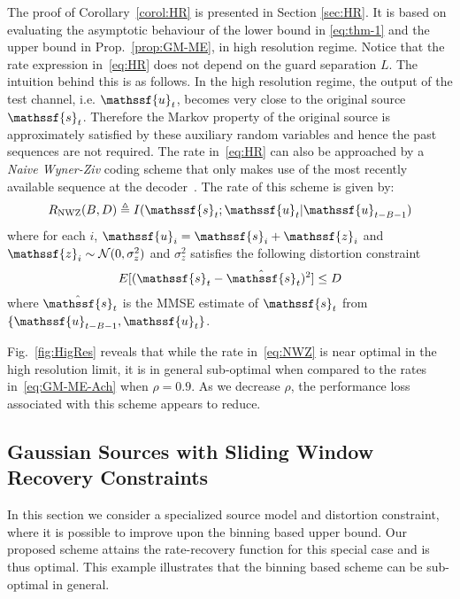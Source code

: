 \documentclass[journal, twocolumn, 10pt]{IEEEtran}
\newcommand{\cN}{{\mathcal{N}}}
\newcommand{\rvs}{{\mathssf{s}}}    %
\newcommand{\rvu}{{\mathssf{u}}}    %
\newcommand{\rvz}{{\mathssf{z}}}    %
\begin{document}
The proof of Corollary~\ref{corol:HR} is presented in Section \ref{sec:HR}. It is based on evaluating the asymptotic behaviour of the lower bound in \eqref{eq:thm-1} and the upper bound in Prop.~\ref{prop:GM-ME}, in high resolution regime. Notice that the rate expression in~\eqref{eq:HR} does not depend on the guard separation $L$. The intuition behind this is as follows. In the high resolution regime, the output of the test channel, i.e. $\rvu_{t}$, becomes very close to the original source $\rvs_{t}$. Therefore the Markov property of the original source is approximately satisfied by these auxiliary random variables and hence the past sequences are not required. The rate in~\eqref{eq:HR} can also be approached by a \emph{Naive Wyner-Ziv} coding scheme that only makes use of the most recently available sequence at the decoder~\cite{oohama1997}. The rate of this scheme is given by:
\begin{align}
R_{\textrm{NWZ}}(B,D) \triangleq I(\rvs_{t} ; \rvu_{t} | \rvu_{t-B-1}) \label{eq:NWZ}
\end{align} where for each $i$, $\rvu_{i} = \rvs_{i} + \rvz_{i}$ and $\rvz_{i} \sim \cN(0,\sigma^2_{z})$ and $\sigma^2_{z}$ satisfies the following distortion constraint
\begin{align}
E[(\rvs_{t}-\hat{\rvs}_{t})^2] \le D 
\end{align} where $\hat{\rvs}_{t}$ is the MMSE estimate of $\rvs_{t}$ from $\{\rvu_{t-B-1}, \rvu_{t}\}$. 


Fig.~\ref{fig:HigRes} reveals that while the rate in~\eqref{eq:NWZ} is near optimal in the high resolution limit, it is in general sub-optimal when compared to the rates in~\eqref{eq:GM-ME-Ach} when $\rho=0.9$. As we decrease $\rho$, the performance loss associated with this scheme appears to reduce.


\subsection{Gaussian Sources with Sliding Window Recovery Constraints}
\label{subsec:GSW}

In this section we consider a specialized source model and distortion constraint, where it is possible to improve upon the binning based upper bound. Our proposed scheme attains the rate-recovery function for this special case and is thus optimal. This example illustrates that the binning based scheme can be sub-optimal in general.

\end{document}
